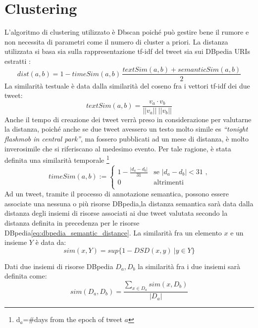 \section{Clustering}
L'algoritmo di clustering utilizzato è  Dbscan poiché può gestire bene il rumore e non necessita di parametri come il numero di cluster a priori. La distanza utilizzata si basa sia sulla rappresentazione tf-idf del tweet sia sui DBpedia URIs estratti :
\begin{equation}
dist(a,b)=1- timeSim(a,b)\,\frac{textSim(a,b)+semanticSim(a,b)}{2}
\end{equation}
La similarità testuale è data dalla similarità del coseno fra i vettori tf-idf dei due tweet:
\begin{equation*}
textSim(a,b)=\frac{v_a \cdot  v_b}{||v_a||\:||v_b||}
\end{equation*}
 Anche il tempo di creazione dei tweet verrà preso in considerazione per valutarne la distanza, poiché anche se due tweet avessero un testo molto simile es \emph{“tonight  flashmob in central park”}, ma fossero pubblicati ad un mese di distanza, è molto inverosimile che si riferiscano al medesimo evento. Per tale ragione, è stata definita una similarità temporale  \footnote{d$_a$=\#days from the epoch of tweet $a$}
\begin{equation*} 
timeSim(a,b):=\begin{cases}
1-\frac{|d_a-d_b|}{31} & \text{se $|d_a-d_b|<31 $  ,}\\
0 & \text{altrimenti}\\
\end{cases}
\end{equation*}
Ad un tweet, tramite il processo di annotazione semantica, possono essere associate una nessuna o più risorse DBpedia,la distanza semantica sarà data dalla distanza degli insiemi di risorse associati ai due tweet valutata secondo la distanza definita in precedenza per le risorse DBpedia\ref{eq:dbpedia_semantic_distance}. La similarità fra un elemento $x$ e un insieme $Y$ è data da:
\begin{equation*}
	sim(x,Y)=sup\{1-DSD(x,y)\:| y\in Y \}
\end{equation*}

Dati due insiemi di risorse DBpedia $D_a,D_b$ la similarità fra i due insiemi sarà definita come: 
\begin{equation}
sim(D_a,D_b)=\frac{\sum\limits_{x \in D_a} sim(x,D_b)  }{|D_a|} 
\end{equation}

